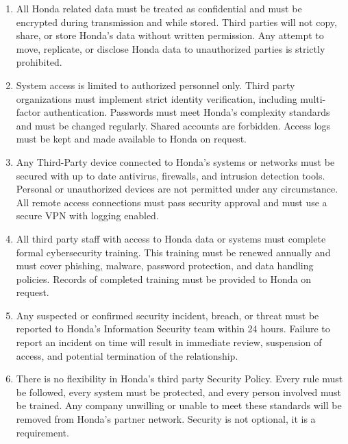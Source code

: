 \begin{enumerate}
    \item \textbf{} All Honda related data must be treated as confidential and must be encrypted during transmission and while stored. Third parties will not copy, share, or store Honda’s data without written permission. Any attempt to move, replicate, or disclose Honda data to unauthorized parties is strictly prohibited.
    
    \item \textbf{}  System access is limited to authorized personnel only. Third party organizations must implement strict identity verification, including multi-factor authentication. Passwords must meet Honda’s complexity standards and must be changed regularly. Shared accounts are forbidden. Access logs must be kept and made available to Honda on request.

     \item \textbf{} Any Third-Party device connected to Honda’s systems or networks must be secured with up to date antivirus, firewalls, and intrusion detection tools. Personal or unauthorized devices are not permitted under any circumstance. All remote access connections must pass security approval and must use a secure VPN with logging enabled.

    \item \textbf{}  All third party staff with access to Honda data or systems must complete formal cybersecurity training. This training must be renewed annually and must cover phishing, malware, password protection, and data handling policies. Records of completed training must be provided to Honda on request.

    \item \textbf{}  Any suspected or confirmed security incident, breach, or threat must be reported to Honda’s Information Security team within 24 hours. Failure to report an incident on time will result in immediate review, suspension of access, and potential termination of the relationship.

    \item \textbf{}There is no flexibility in Honda’s third party Security Policy. Every rule must be followed, every system must be protected, and every person involved must be trained. Any company unwilling or unable to meet these standards will be removed from Honda’s partner network. Security is not optional, it is a requirement.
    
\end{enumerate}

